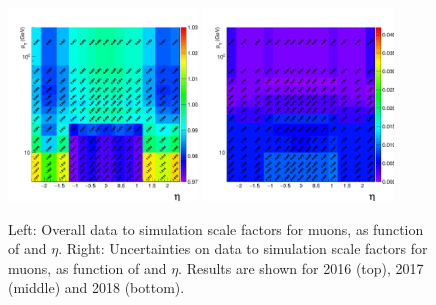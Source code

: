 \begin{figure}[htbp]
\begin{center}
		\includegraphics[width=0.45\textwidth]{Figures/Muons/2018_SF_rereco_LooseGT20syst.png} 
		\includegraphics[width=0.45\textwidth]{Figures/Muons/2018_SF_errors_rereco_LooseGT20syst.png}
    \caption{Left: Overall data to simulation scale factors for muons, as function of \pt and $\eta$. Right: Uncertainties on  data to simulation scale factors for muons, as function of \pt and $\eta$. Results are shown for 2016 (top), 2017 (middle) and 2018 (bottom).}
    \label{fig:MuonIDEff_5}
\end{center}
\end{figure}


